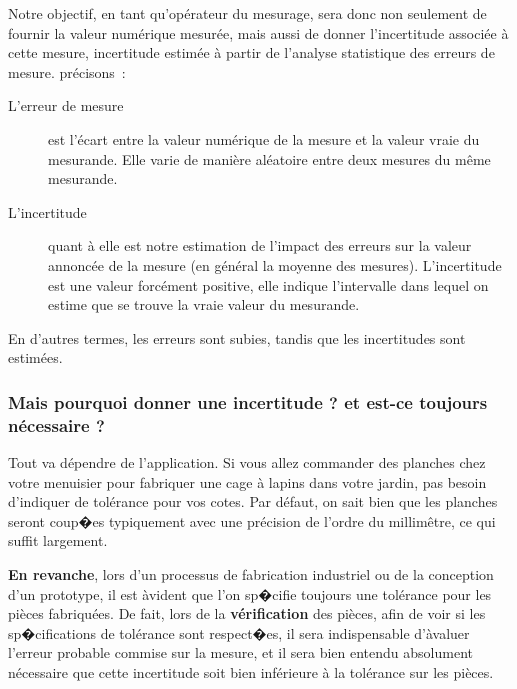 Notre objectif, en tant qu'opérateur du mesurage, sera donc non seulement de fournir la valeur numérique mesurée, mais aussi de donner l'incertitude associée à cette mesure, incertitude estimée à partir de l'analyse statistique des erreurs de mesure. précisons~:

\begin{description}
\item[L'erreur de mesure] est l'écart entre la valeur numérique de la mesure et la valeur vraie du mesurande. Elle varie de manière aléatoire entre deux mesures du même mesurande.
\item[L'incertitude] quant à elle est notre estimation de l'impact des erreurs sur la valeur annoncée de la mesure (en général la moyenne des mesures). L'incertitude est une valeur forcément positive, elle indique l'intervalle dans lequel on estime que se trouve la vraie valeur du mesurande.
\end{description}
En d'autres termes, les erreurs sont subies, tandis que les incertitudes sont estimées.

\subsubsection*{Mais pourquoi donner une incertitude ? et est-ce toujours nécessaire ?}

Tout va dépendre de l'application. Si vous allez commander des planches chez votre menuisier pour fabriquer une cage à lapins dans votre jardin, pas besoin d'indiquer de tolérance pour vos cotes. Par défaut, on sait bien que les planches seront coup�es typiquement avec une précision de l'ordre du millimêtre, ce qui suffit largement.

\textbf{En revanche}, lors d'un processus de fabrication industriel ou de la conception d'un prototype, il est àvident que l'on sp�cifie toujours une tolérance pour les pièces fabriquées. De fait, lors de la \textbf{vérification} des pièces, afin de voir si les sp�cifications de tolérance sont respect�es, il sera indispensable d'àvaluer l'erreur probable commise sur la mesure, et il sera bien entendu absolument nécessaire que cette incertitude soit bien inférieure à la tolérance sur les pièces.

